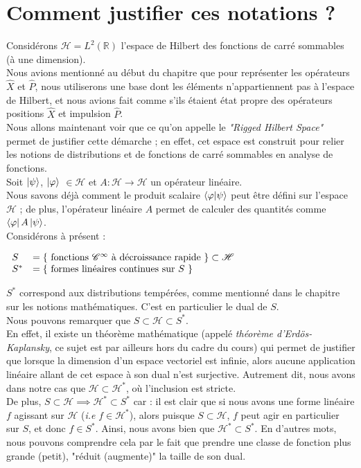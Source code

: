 \documentclass[../notesdecours]{subfiles}
\begin{document}
\section{Comment justifier ces notations ?}

Considérons $\mathcal{H} = L^2(\mathbb{R})$ l'espace de Hilbert des fonctions de carré sommables (à une dimension). \\ 
Nous avions mentionné au début du chapitre que pour représenter les opérateurs $\hat{X}$ et $\hat{P}$, nous utiliserons une base dont les éléments n'appartiennent pas à l'espace de Hilbert, et nous avions fait comme s'ils étaient état propre des opérateurs positions $\hat{X}$ et impulsion $\hat{P}$. \\
Nous allons maintenant voir que ce qu'on appelle le \textit{"Rigged Hilbert Space"} permet de justifier cette démarche ; en effet, cet espace est construit pour relier les notions de distributions et de fonctions de carré sommables en analyse de fonctions. \\

Soit $\ket{\psi}$, $\ket{\varphi}$ $\in \mathcal{H}$ et $A : \mathcal{H} \rightarrow \mathcal{H}$ un opérateur linéaire. \\
Nous savons déjà comment le produit scalaire $\braket{\varphi | \psi}$ peut être défini sur l'espace $\mathcal{H}$ ; de plus, l'opérateur linéaire $A$ permet de calculer des quantités comme $\bra{\varphi} A \ket{\psi}$. \\

Considérons à présent : 

$\begin{array}{ll}
S &=\left\{ \mbox{ fonctions $\mathcal{C}^{\infty}$ à décroissance rapide } \right\} \subset \mathcal{H} \notag \\
S^*&= \left\{ \mbox{ formes linéaires continues sur $S$ } \right\} \notag
\end{array}$

$S^*$ correspond aux distributions tempérées, comme mentionné dans le chapitre sur les notions mathématiques. C'est en particulier le dual de $S$. \\


Nous pouvons remarquer que $S \subset \mathcal{H} \subset{S^*}$. \\
En effet, il existe un théorème mathématique (appelé \textit{théorème d'Erdös-Kaplansky}, ce sujet est par ailleurs hors du cadre du cours) qui permet de justifier que lorsque la dimension d'un espace vectoriel est infinie, alors aucune application linéaire allant de cet espace à son dual n'est surjective. Autrement dit, nous avons dans notre cas que $\mathcal{H} \subset \mathcal{H}^*$, où l'inclusion est stricte. \\
De plus, $S \subset \mathcal{H} \implies \mathcal{H}^* \subset S^*$ car : il est clair que si nous avons une forme linéaire $f$ agissant sur $\mathcal{H}$ (\textit{i.e} $f \in \mathcal{H}^*$), alors puisque $S \subset \mathcal{H}$, $f$ peut agir en particulier sur $S$, et donc $f \in S^*$. Ainsi, nous avons bien que $\mathcal{H}^* \subset S^*$. En d'autres mots, nous pouvons comprendre cela par le fait que prendre une classe de fonction plus grande (petit), "réduit (augmente)" la taille de son dual. \\
\end{document}
